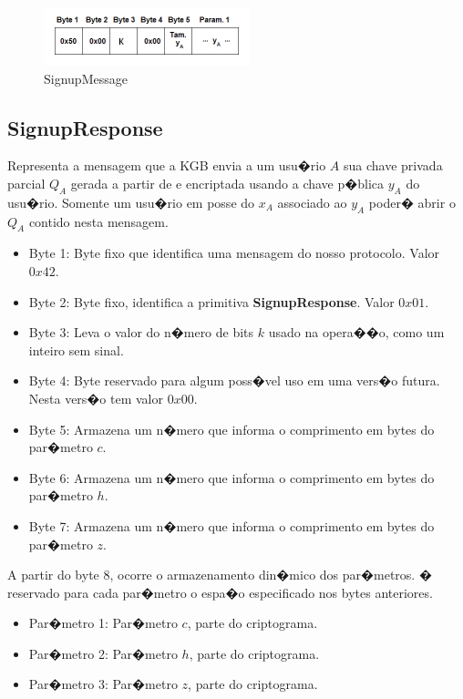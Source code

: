 \documentclass[a4paper,capchap,espacoduplo,normaltoc]{abntepusp}
\begin{document}
\begin{figure}[h]
	\centering
		\includegraphics{figuras/requestmyqamessage.PNG}
	\caption{SignupMessage}
	\label{fig:SignupMessage}
\end{figure}

\subsection{SignupResponse}
Representa a mensagem que a KGB envia a um usu�rio $A$ sua chave privada parcial $Q_A$ gerada a partir de e encriptada usando a chave p�blica $y_A$ do usu�rio. Somente um usu�rio em posse do $x_A$ associado ao $y_A$ poder� abrir o $Q_A$ contido nesta mensagem.

\begin{itemize}
	\item Byte 1: Byte fixo que identifica uma mensagem do nosso protocolo. Valor $0x42$.
	\item Byte 2: Byte fixo, identifica a primitiva \textbf{SignupResponse}. Valor $0x01$.
	\item Byte 3: Leva o valor do n�mero de bits $k$ usado na opera��o, como um inteiro sem sinal.
	\item Byte 4: Byte reservado para algum poss�vel uso em uma vers�o futura. Nesta vers�o tem valor $0x00$.	
	\item Byte 5: Armazena um n�mero que informa o comprimento em bytes do par�metro $c$.
	\item Byte 6: Armazena um n�mero que informa o comprimento em bytes do par�metro $h$.
	\item Byte 7: Armazena um n�mero que informa o comprimento em bytes do par�metro $z$.
\end{itemize}	
A partir do byte 8, ocorre o armazenamento din�mico dos par�metros. � reservado para cada par�metro o espa�o especificado nos bytes anteriores.
\begin{itemize}
	\item Par�metro 1: Par�metro $c$, parte do criptograma.
	\item Par�metro 2: Par�metro $h$, parte do criptograma.
	\item Par�metro 3: Par�metro $z$, parte do criptograma.	
\end{itemize}
\end{document}
